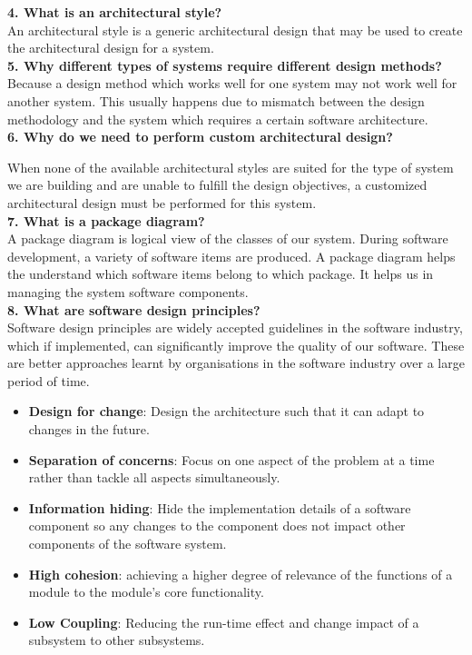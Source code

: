 \documentclass[12pt,letterpaper,titlepage,en-US]{article}
\begin{document}
        
        
   \textbf{4. What is an architectural style?}\\
   An architectural style is a generic architectural design that may be used to create the architectural design for a system.\\

  
   \textbf{5. Why different types of systems require different design methods?}\\
   Because a design method which works well for one system may not work well for another system. This usually happens due to mismatch between the design methodology and the system which requires a certain software architecture.\\
   
   
   
\textbf{6. Why do we need to perform custom architectural design?}


When none of the available architectural styles are suited for the type of system we are building and are unable to fulfill the design objectives, a customized architectural design must be performed for this system.\\
        
        
         \textbf{7. What is a package diagram?}\\
        A package diagram is logical view of the classes of our system. During software development, a variety of software items are produced. A package diagram helps the understand which software items belong to which package. It helps us in managing the system software components.\\
        
        \textbf{8. What are software design principles?}\\
       Software design principles are widely accepted guidelines in the software industry, which if implemented, can significantly improve the quality of our software. These are better approaches learnt by organisations in the software industry over a large period of time.
       
\begin{itemize}[noitemsep,nolistsep]
\item \textbf{Design for change}: Design the architecture such that it can adapt to changes in the future.
\item \textbf{Separation of concerns}: Focus on one aspect of the problem at a time rather than tackle all aspects simultaneously.
\item \textbf{Information hiding}: Hide the implementation details of a software component so any changes to the component does not impact  other components of the software system. 
\item \textbf{High cohesion}: achieving a higher degree of relevance of the functions of a module to the module’s core functionality. 
\item \textbf{Low Coupling}: Reducing the run-time effect and change impact of a subsystem to other subsystems. \\
\end{itemize}
\end{document}
